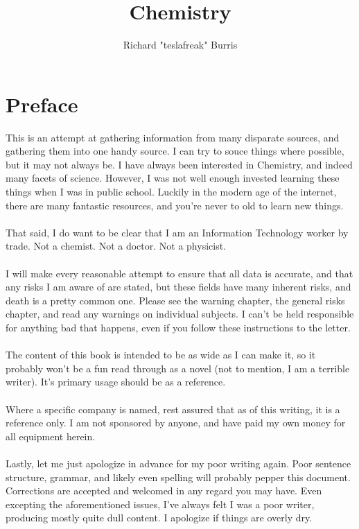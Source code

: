 \documentclass{book}
\author{Richard "teslafreak" Burris}
\title{Chemistry}
\begin{document}
\maketitle
\newpage
\tableofcontents
\newpage

\chapter{Preface}
This is an attempt at gathering information from many disparate sources, and gathering them into one handy source.  I can try to souce things where possible, but it may not always be.  I have always been interested in Chemistry, and indeed many facets of science.  However, I was not well enough invested learning these things when I was in public school.  Luckily in the modern age of the internet, there are many fantastic resources, and you're never to old to learn new things.\\
\\
That said, I do want to be clear that I am an Information Technology worker by trade.  Not a chemist.  Not a doctor.  Not a physicist.\\
\\
I will make every reasonable attempt to ensure that all data is accurate, and that any risks I am aware of are stated, but these fields have many inherent risks, and death is a pretty common one.  Please see the warning chapter, the general risks chapter, and read any warnings on individual subjects.  I can't be held responsible for anything bad that happens, even if you follow these instructions to the letter.\\
\\
The content of this book is intended to be as wide as I can make it, so it probably won't be a fun read through as a novel (not to mention, I am a terrible writer).  It's primary usage should be as a reference.\\
\\
Where a specific company is named, rest assured that as of this writing, it is a reference only.  I am not sponsored by anyone, and have paid my own money for all equipment herein.\\
\\
Lastly, let me just apologize in advance for my poor writing again.  Poor sentence structure, grammar, and likely even spelling will probably pepper this document.  Corrections are accepted and welcomed in any regard you may have.  Even excepting the aforementioned issues, I've always felt I was a poor writer, producing mostly quite dull content.  I apologize if things are overly dry.  
\end{document}
